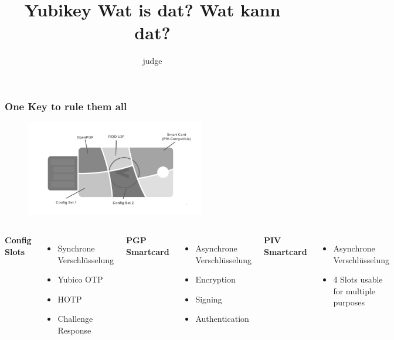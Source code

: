 \documentclass{beamer}
\title{Yubikey Wat is dat? Wat kann dat?}
\author{judge}
\date{}
\begin{document}
 
\frame{\titlepage}

\begin{frame}
\frametitle{One Key to rule them all}
	\begin{figure}[h]
		\center
		\includegraphics[width=0.7\textwidth]{images/functionality.png}
	\end{figure}
	\begin{columns}
			\pause
			\textbf{Config Slots}
			\begin{itemize}
				\item<3->{Synchrone Verschlüsselung}
				\item<3->{Yubico OTP}
				\item<3->{HOTP}
				\item<3->{Challenge Response}
			\end{itemize}
			\textbf{PGP Smartcard}
			\begin{itemize}
				\item<4->{Asynchrone Verschlüsselung}
				\item<4->{Encryption}
				\item<4->{Signing}
				\item<4->{Authentication}
			\end{itemize}
			\textbf{PIV Smartcard}
			\begin{itemize}
				\item<5->{Asynchrone Verschlüsselung}
				\item<5->{4 Slots usable for multiple purposes}
			\end{itemize}
	\end{columns}
\end{frame}
\end{document}
